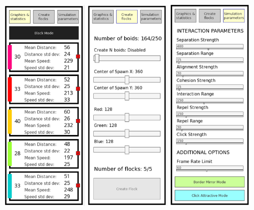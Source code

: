 \documentclass[10pt,a4paper]{article}
\begin{document}
\begin{center}
    \includegraphics[width=0.32\textwidth]{../images/option1.png}
    \includegraphics[width=0.32\textwidth]{../images/option2.png}
    \includegraphics[width=0.32\textwidth]{../images/option3.png}
\end{center}
\end{document}
